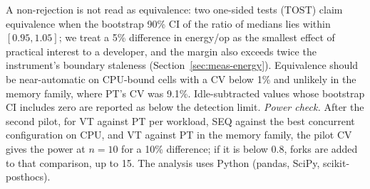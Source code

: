 A non-rejection is not read as equivalence: two one-sided tests (TOST) claim equivalence when the bootstrap 90\% CI of the ratio of medians lies within $[0.95, 1.05]$; we treat a 5\% difference in energy/op as the smallest effect of practical interest to a developer, and the margin also exceeds twice the instrument's boundary staleness (Section~\ref{sec:meas-energy}). Equivalence should be near-automatic on CPU-bound cells with a CV below 1\% and unlikely in the memory family, where PT's CV was 9.1\%. Idle-subtracted values whose bootstrap CI includes zero are reported as below the detection limit. \emph{Power check.} After the second pilot, for VT against PT per workload, SEQ against the best concurrent configuration on CPU, and VT against PT in the memory family, the pilot CV gives the power at $n = 10$ for a 10\% difference; if it is below 0.8, forks are added to that comparison, up to 15. The analysis uses Python (pandas, SciPy, scikit-posthocs). 
